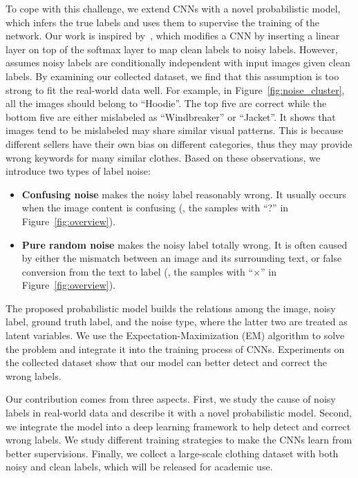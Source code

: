 \documentclass[10pt,twocolumn,letterpaper]{article}
\begin{document}
To cope with this challenge, we extend CNNs with a novel probabilistic model, which infers the true labels and uses them to supervise the training of the network. Our work is inspired by~\cite{sukhbaatar2014learning}, which modifies a CNN by inserting a linear layer on top of the softmax layer to map clean labels to noisy labels. However,~\cite{sukhbaatar2014learning} assumes noisy labels are conditionally independent with input images given clean labels. By examining our collected dataset, we find that this assumption is too strong to fit the real-world data well. For example, in Figure~\ref{fig:noise_cluster}, all the images should belong to ``Hoodie''. The top five are correct while the bottom five are either mislabeled as ``Windbreaker'' or ``Jacket''. It shows that images tend to be mislabeled may share similar visual patterns. This is because different sellers have their own bias on different categories, thus they may provide wrong keywords for many similar clothes. Based on these observations, we introduce two types of label noise:
\begin{itemize}
\item \textbf{Confusing noise} makes the noisy label reasonably wrong. It usually occurs when the image content is confusing (\eg, the samples with ``?'' in Figure~\ref{fig:overview}).
\item \textbf{Pure random noise} makes the noisy label totally wrong. It is often caused by either the mismatch between an image and its surrounding text, or false conversion from the text to label (\eg, the samples with ``$\times$'' in Figure~\ref{fig:overview}).
\end{itemize}

The proposed probabilistic model builds the relations among the image, noisy label, ground truth label, and the noise type, where the latter two are treated as latent variables. We use the Expectation-Maximization (EM) algorithm to solve the problem and integrate it into the training process of CNNs. Experiments on the collected dataset show that our model can better detect and correct the wrong labels.

Our contribution comes from three aspects. First, we study the cause of noisy labels in real-world data and describe it with a novel probabilistic model. Second, we integrate the model into a deep learning framework to help detect and correct wrong labels. We study different training strategies to make the CNNs learn from better supervisions. Finally, we collect a large-scale clothing dataset with both noisy and clean labels, which will be released for academic use.
\end{document}
